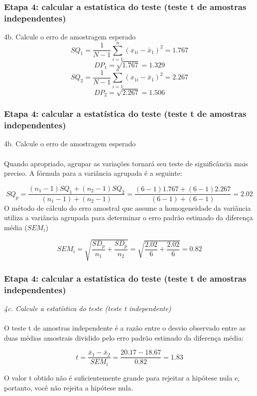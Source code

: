 \documentclass[11pt]{beamer}
\begin{document}
\begin{frame}
\frametitle{Etapa 4: calcular a estatística do teste (teste t de amostras independentes)}
4b. Calcule o erro de amostragem esperado
\[SQ_1 = \frac{1}{N-1}\sum_{i=1}^n(x_{1i} - \bar{x}_1)^2 = 1.767\]
\[DP_1 = \sqrt{1.767} = 1.329\]
\[SQ_2 = \frac{1}{N-1}\sum_{i=1}^n(x_{1i} - \bar{x}_1)^2 = 2.267\]
\[DP_2 = \sqrt{2.267} = 1.506\]

\end{frame}

\begin{frame}
\frametitle{Etapa 4: calcular a estatística do teste (teste t de amostras independentes)}
4b. Calcule o erro de amostragem esperado\\~\\
Quando apropriado, agrupar as variações tornará seu teste de significância mais preciso. A fórmula para a variância agrupada é a seguinte:

\[SQ_p = \frac{(n_1-1)SQ_1+(n_2-1)SQ_2}{(n_1-1)+(n_2-1)} = \frac{(6-1)1.767+(6-1)2.267}{(6-1)+(6-1)}=2.02\]
O método de cálculo do erro amostral que assume a homogeneidade da variância utiliza a variância agrupada para determinar o erro padrão estimado da diferença média ($SEM_i$)

\[SEM_i = \sqrt{\frac{SD_p}{n_1}+\frac{SD_p}{n_2}} = \sqrt{\frac{2.02}{6}+\frac{2.02}{6}} = 0.82\]

\end{frame}

\begin{frame}
\frametitle{Etapa 4: calcular a estatística do teste (teste t de amostras independentes)}

\textit{4c. Calcule a estatística do teste (teste t independente)}\\~\\

O teste t de amostras independente é a razão entre o desvio observado entre as duas médias amostrais dividido pelo erro padrão estimado da diferença média:

\[t = \frac{\bar{x}_1-\bar{x}_2}{SEM_i} =  \frac{20.17 - 18.67}{0.82} = 1.83\]

O valor t obtido não é suficientemente grande para rejeitar a hipótese nula e, portanto, você não rejeita a hipótese nula.

\end{frame}
\end{document}
